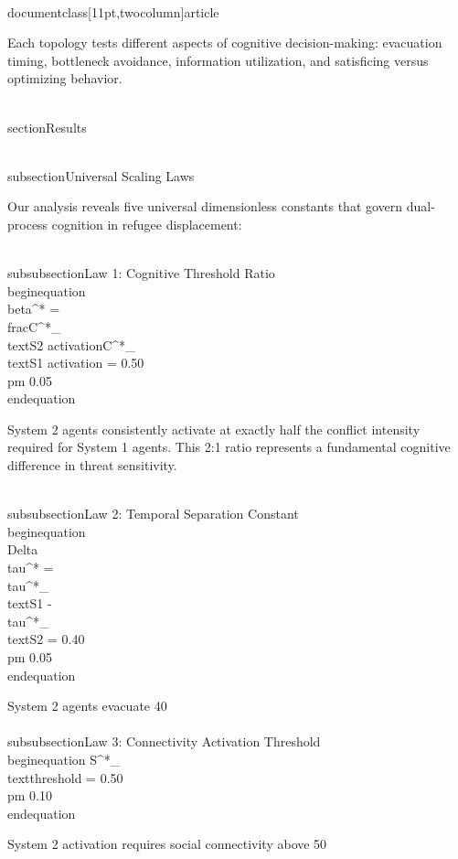 \\documentclass[11pt,twocolumn]{article}
\begin{document}
Each topology tests different aspects of cognitive decision-making: evacuation timing, bottleneck avoidance, information utilization, and satisficing versus optimizing behavior.

\\section{Results}

\\subsection{Universal Scaling Laws}

Our analysis reveals five universal dimensionless constants that govern dual-process cognition in refugee displacement:

\\subsubsection{Law 1: Cognitive Threshold Ratio}
\\begin{equation}
\\beta^* = \\frac{C^*_{\\text{S2 activation}}}{C^*_{\\text{S1 activation}}} = 0.50 \\pm 0.05
\\end{equation}

System 2 agents consistently activate at exactly half the conflict intensity required for System 1 agents. This 2:1 ratio represents a fundamental cognitive difference in threat sensitivity.

\\subsubsection{Law 2: Temporal Separation Constant}
\\begin{equation}
\\Delta\\tau^* = \\tau^*_{\\text{S1}} - \\tau^*_{\\text{S2}} = 0.40 \\pm 0.05
\\end{equation}

System 2 agents evacuate 40\\%

\\subsubsection{Law 3: Connectivity Activation Threshold}
\\begin{equation}
S^*_{\\text{threshold}} = 0.50 \\pm 0.10
\\end{equation}

System 2 activation requires social connectivity above 50\\%
\end{document}
